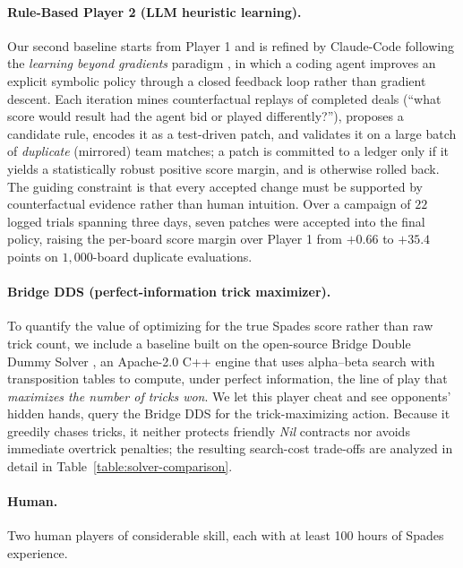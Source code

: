\documentclass{article}
\begin{document}
\paragraph{Rule-Based Player 2 (LLM heuristic learning).}
Our second baseline starts from Player 1 and is refined by Claude-Code following the \emph{learning beyond gradients} paradigm \citep{weng2026learning_beyond_gradients}, in which a coding agent improves an explicit symbolic policy through a closed feedback loop rather than gradient descent. Each iteration mines counterfactual replays of completed deals (``what score would result had the agent bid or played differently?''), proposes a candidate rule, encodes it as a test-driven patch, and validates it on a large batch of \textit{duplicate} (mirrored) team matches; a patch is committed to a ledger only if it yields a statistically robust positive score margin, and is otherwise rolled back. The guiding constraint is that every accepted change must be supported by counterfactual evidence rather than human intuition. Over a campaign of $22$ logged trials spanning three days, seven patches were accepted into the final policy, raising the per-board score margin over Player 1 from $+0.66$ to $+35.4$ points on $1{,}000$-board duplicate evaluations.

\paragraph{Bridge DDS (perfect-information trick maximizer).}
To quantify the value of optimizing for the true Spades score rather than raw trick count, we include a baseline built on the open-source Bridge Double Dummy Solver \citep{haglund2024dds}, an Apache-2.0 C++ engine that uses alpha--beta search with transposition tables to compute, under perfect information, the line of play that \emph{maximizes the number of tricks won}. We let this player cheat and see opponents' hidden hands, query the Bridge DDS for the trick-maximizing action. Because it greedily chases tricks, it neither protects friendly \textit{Nil} contracts nor avoids immediate overtrick penalties; the resulting search-cost trade-offs are analyzed in detail in Table~\ref{table:solver-comparison}.

\paragraph{Human.}
Two human players of considerable skill, each with at least 100 hours of Spades experience.
\end{document}
